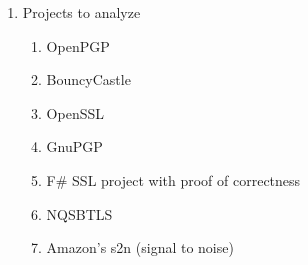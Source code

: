 \documentclass[letterpaper,twocolumn,10pt]{article}
\begin{document}
\begin{enumerate}
\begin{enumerate}
		\end{enumerate}
	\item Projects to analyze 
		\begin{enumerate}
			\item OpenPGP
			\item BouncyCastle
			\item OpenSSL
			\item GnuPGP
			\item F\# SSL project with proof of correctness
			\item NQSBTLS
			\item Amazon's s2n (signal to noise)
		\end{enumerate}
\end{enumerate}






\end{document}
